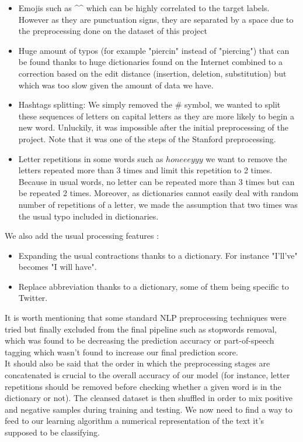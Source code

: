 \documentclass[10pt,conference,compsocconf]{IEEEtran}
\begin{document}
\begin{itemize}
    \item Emojis such as \^{}\^{}  which can be highly correlated to the target labels. However as they are punctuation signs, they are separated by a space due to the preprocessing done on the dataset of this project
    \item Huge amount of typos (for example "piercin" instead of "piercing") that can be found thanks to huge dictionaries found on the Internet combined to a correction based on the edit distance (insertion, deletion, substitution) but which was too slow given the amount of data we have.
    \item Hashtags splitting: We simply removed the \# symbol, we wanted to split these sequences of letters on capital letters as they are more likely to begin a new word. Unluckily, it was impossible after the initial preprocessing of the project. Note that it was one of the steps of the Stanford preprocessing.
    \item Letter repetitions in some words such as $honeeeyyy$ we want to remove the letters repeated more than 3 times and limit this repetition to 2 times. Because in usual words, no letter can be repeated more than 3 times but can be repeated 2 times. Moreover, as dictionaries cannot easily deal with random number of repetitions of a letter, we made the assumption that two times was the usual typo included in dictionaries.
\end{itemize}

We also add the usual processing features : 
\begin{itemize}
    \item Expanding the usual contractions thanks to a dictionary. For instance "I'll've" becomes "I will have".
    \item Replace abbreviation thanks to a dictionary, some of them being specific to Twitter.
\end{itemize}
It is worth mentioning that some standard NLP preprocessing techniques were tried but finally excluded from the final pipeline such as stopwords removal, which was found to be decreasing the prediction accuracy  or part-of-speech tagging which wasn't found to increase our final prediction score. \\

It should also be said that the order in which the preprocessing stages are concatenated is crucial to the overall accuracy of our model (for instance, letter repetitions should be removed before checking whether a given word is in the dictionary or not). The cleansed dataset is then shuffled in order to mix positive and negative samples during training and testing. We now need to find a way to feed to our learning algorithm a numerical representation of the text it's supposed to be classifying. 
\end{document}
